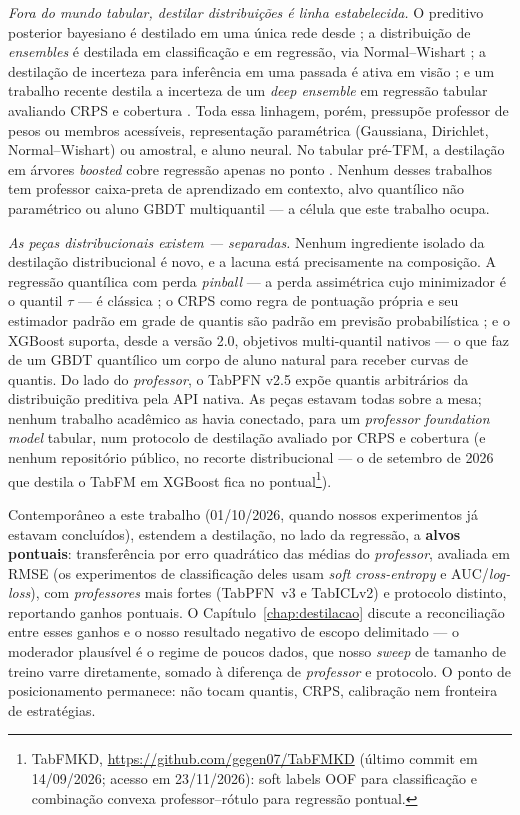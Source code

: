 \emph{Fora do mundo tabular, destilar distribuições é linha
estabelecida.} O preditivo posterior bayesiano é destilado em uma única
rede desde \citet{korattikara2015}; a distribuição de \emph{ensembles} é
destilada em classificação \citep{malinin2020end2} e em regressão, via
Normal--Wishart \citep{malinin2020rpn}; a destilação de incerteza para
inferência em uma passada é ativa em visão \citep{shen2021}; e um
trabalho recente destila a incerteza de um \emph{deep ensemble} em
regressão tabular avaliando CRPS e cobertura \citep{park2025uncertainty}.
Toda essa linhagem, porém, pressupõe professor de pesos ou membros
acessíveis, representação paramétrica (Gaussiana, Dirichlet,
Normal--Wishart) ou amostral, e aluno neural. No tabular pré-TFM, a
destilação em árvores \emph{boosted} cobre regressão apenas no ponto
\citep{fakoor2020}. Nenhum desses trabalhos tem professor caixa-preta de
aprendizado em contexto, alvo quantílico não paramétrico ou aluno GBDT
multiquantil --- a célula que este trabalho ocupa.

\emph{As peças distribucionais existem --- separadas.} Nenhum ingrediente
isolado da destilação distribucional é novo, e a lacuna está precisamente
na composição. A regressão quantílica com perda
\emph{pinball} --- a perda assimétrica cujo minimizador é o quantil
$\tau$ --- é clássica \citep{koenker1978}; o CRPS como regra de pontuação
própria e seu estimador padrão em grade de quantis são padrão em
previsão probabilística \citep{gneiting2007,gneiting2011}; e o XGBoost
\citep{chen2016} suporta, desde a versão 2.0, objetivos multi-quantil
nativos --- o que faz de um GBDT quantílico um corpo de aluno natural
para receber curvas de quantis. Do lado do \emph{professor}, o TabPFN v2.5
expõe quantis arbitrários da distribuição preditiva pela API nativa.
As peças estavam todas sobre a mesa; nenhum trabalho acadêmico as havia
conectado, para um \emph{professor foundation model} tabular, num
protocolo de destilação avaliado por CRPS e cobertura
(e nenhum repositório público, no recorte distribucional ---
o de setembro de 2026 que destila o TabFM em XGBoost fica no
pontual\footnote{TabFMKD,
\url{https://github.com/gegen07/TabFMKD} (último commit em
14/09/2026; acesso em 23/11/2026): soft labels OOF para classificação e
combinação convexa professor--rótulo para regressão pontual.}).

Contemporâneo a este trabalho
(01/10/2026, quando nossos experimentos já estavam concluídos),
\citet{jeong2026} estendem a destilação, no lado da regressão, a
\textbf{alvos pontuais}: transferência por erro quadrático das médias
do \emph{professor},
avaliada em RMSE (os experimentos de classificação deles usam
\emph{soft} \emph{cross-entropy} e AUC/\emph{log-loss}), com
\emph{professores} mais fortes (TabPFN~v3 e
TabICLv2) e protocolo distinto, reportando ganhos pontuais. O
Capítulo~\ref{chap:destilacao} discute a reconciliação entre esses ganhos
e o nosso resultado negativo de escopo delimitado --- o moderador
plausível é o regime de poucos dados, que nosso \emph{sweep} de tamanho de
treino varre diretamente, somado à diferença de \emph{professor} e
protocolo. O ponto de posicionamento permanece: \citet{jeong2026} não
tocam quantis, CRPS, calibração nem fronteira de estratégias.

